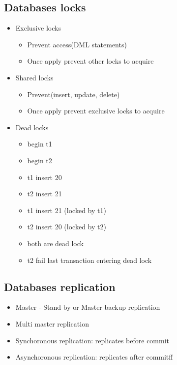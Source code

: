 \documentclass[../../main.tex]{subfiles}
\begin{document}
\subsection{Databases locks}
\begin{itemize}
    \item Exclusive locks
    \begin{itemize}
        \item Prevent access(DML statements)
        \item Once apply prevent other locks to acquire
    \end{itemize}
    \item Shared locks
    \begin{itemize}
        \item Prevent(insert, update, delete)
        \item Once apply prevent exclusive locks to acquire
    \end{itemize}
    \item Dead locks
    \begin{itemize}
        \item begin t1
        \item begin t2
        \item t1 insert 20
        \item t2 insert 21
        \item t1 insert 21 (locked by t1)
        \item t2 insert 20 (locked by t2)
        \item both are dead lock
        \item t2 fail last transaction entering dead lock
    \end{itemize}
\end{itemize}


\subsection{Databases replication}
\begin{itemize}
    \item Master - Stand by or Master backup replication
    \item Multi master replication
    \item Synchoronous replication: replicates before commit
    \item Asynchoronous replication: replicates after commitff
\end{itemize}
\end{document}
